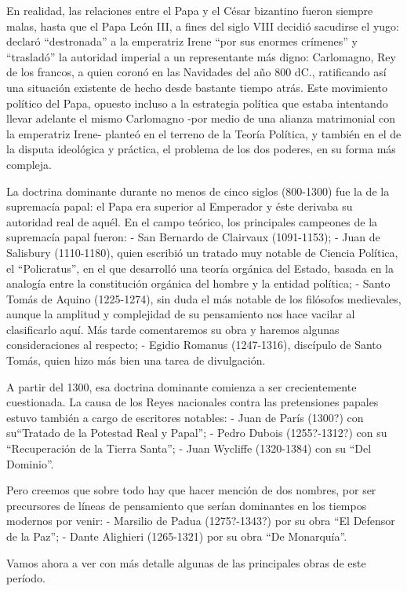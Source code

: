 \documentclass[
]{book}
\begin{document}
En realidad, las relaciones entre el Papa y el César bizantino fueron siempre malas, hasta que el Papa León III, a fines del siglo VIII decidió sacudirse el yugo: declaró ``destronada'' a la emperatriz Irene ``por sus enormes crímenes'' y ``trasladó'' la autoridad imperial a un representante más digno: Carlomagno, Rey de los francos, a quien coronó en las Navidades del año 800 dC., ratificando así una situación existente de hecho desde bastante tiempo atrás. Este movimiento político del Papa, opuesto incluso a la estrategia política que estaba intentando llevar adelante el mismo Carlomagno -por medio de una alianza matrimonial con la emperatriz Irene- planteó en el terreno de la Teoría Política, y también en el de la disputa ideológica y práctica, el problema de los dos poderes, en su forma más compleja.

La doctrina dominante durante no menos de cinco siglos (800-1300) fue la de la supremacía papal: el Papa era superior al Emperador y éste derivaba su autoridad real de aquél. En el campo teórico, los principales campeones de la supremacía papal fueron: - San Bernardo de Clairvaux (1091-1153); - Juan de Salisbury (1110-1180), quien escribió un tratado muy notable de Ciencia Política, el ``Policratus'', en el que desarrolló una teoría orgánica del Estado, basada en la analogía entre la constitución orgánica del hombre y la entidad política; - Santo Tomás de Aquino (1225-1274), sin duda el más notable de los filósofos medievales, aunque la amplitud y complejidad de su pensamiento nos hace vacilar al clasificarlo aquí. Más tarde comentaremos su obra y haremos algunas consideraciones al respecto; - Egidio Romanus (1247-1316), discípulo de Santo Tomás, quien hizo más bien una tarea de divulgación.

A partir del 1300, esa doctrina dominante comienza a ser crecientemente cuestionada. La causa de los Reyes nacionales contra las pretensiones papales estuvo también a cargo de escritores notables: - Juan de París (1300?) con su``Tratado de la Potestad Real y Papal''; - Pedro Dubois (1255?-1312?) con su ``Recuperación de la Tierra Santa''; - Juan Wycliffe (1320-1384) con su ``Del Dominio''.

Pero creemos que sobre todo hay que hacer mención de dos nombres, por ser precursores de líneas de pensamiento que serían dominantes en los tiempos modernos por venir: - Marsilio de Padua (1275?-1343?) por su obra ``El Defensor de la Paz''; - Dante Alighieri (1265-1321) por su obra ``De Monarquía''.

Vamos ahora a ver con más detalle algunas de las principales obras de este período.
\end{document}
